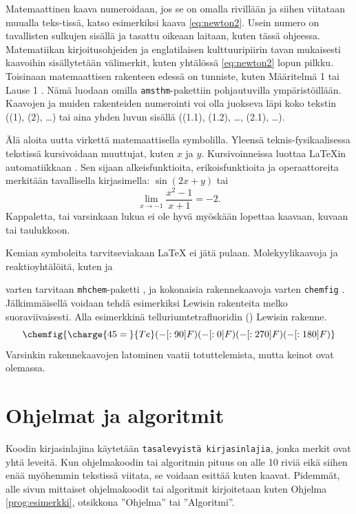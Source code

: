 Matemaattinen kaava numeroidaan, jos se on omalla rivillään ja siihen viitataan muualla teks-tissä, katso esimerkiksi kaava \eqref{eq:newton2}. Usein numero on tavallisten sulkujen sisällä ja tasattu oikeaan laitaan, kuten tässä ohjeessa. Matematiikan kirjoitusohjeiden ja englatilaisen kulttuuripiirin tavan mukaisesti kaavoihin sisällytetään välimerkit, kuten yhtälössä \eqref{eq:newton2} lopun pilkku. Toisinaan matemaattisen rakenteen edessä on tunniste, kuten Määritelmä 1 tai Lause 1 \parencite{matohje2009}. Nämä luodaan omilla \texttt{amsthm}-pakettiin pohjautuvilla ympäristöillään. Kaavojen ja muiden rakenteiden numerointi voi olla juokseva läpi koko tekstin ((1), (2), \ldots) tai aina yhden luvun sisällä ((1.1), (1.2), \ldots, (2.1), \ldots).

Älä aloita uutta virkettä matemaattisella symbolilla. Yleensä teknis-fysikaalisessa tekstissä kursivoidaan muuttujat, kuten $x$ ja $y$. Kursivoinneissa luottaa \LaTeX{}in automatiikkaan \parencite{notsoshort}. Sen sijaan alkeisfunktioita, erikoisfunktioita ja operaattoreita merkitään tavallisella kirjasimella: $\sin(2x + y)$ tai
\begin{equation*}
    \lim_{x \rightarrow -1}\frac{x^2 - 1}{x + 1} = -2.
\end{equation*}
Kappaletta, tai varsinkaan lukua ei ole hyvä myöskään lopettaa kaavaan, kuvaan tai taulukkoon.

Kemian symboleita tarvitseviakaan \LaTeX{} ei jätä pulaan. Molekyylikaavoja ja reaktioyhtälöitä, kuten  ja
\begin{center}
\end{center}
varten tarvitaan \texttt{mhchem}-paketti \parencite{mhchem}, ja kokonaisia rakennekaavoja varten \texttt{chemfig} \parencite{chemfig}. Jälkimmäisellä voidaan tehdä esimerkiksi Lewisin rakenteita melko suoraviivaisesti. Alla esimerkkinä telluriumtetrafluoridin () Lewisin rakenne.
\[
\chemfig{
  \charge{45=\:}{Te}(-[:90]F)(-[:0]F)(-[:270]F)(-[:180]F)
}
\]
Varsinkin rakennekaavojen latominen vaatii totuttelemista, mutta keinot ovat olemassa.

\section{Ohjelmat ja algoritmit}

Koodin kirjasinlajina käytetään \texttt{tasalevyistä kirjasinlajia}, jonka merkit ovat yhtä leveitä. Kun ohjelmakoodin tai algoritmin pituus on alle 10 riviä eikä siihen enää myöhemmin tekstissä viitata, se voidaan esittää kuten kaavat. Pidemmät, alle sivun mittaiset ohjelmakoodit tai algoritmit kirjoitetaan kuten Ohjelma \ref{prog:esimerkki}, otsikkona ''Ohjelma'' tai ''Algoritmi''.

